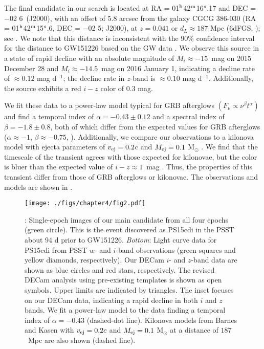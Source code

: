 \clearpage
The final candidate in our search is located at RA = 01$^{\rm h}$42$^{\rm m}$16$^{\rm s}$.17 and DEC = $-$02 6\arcsec~(J2000), with an offset of $5.8$ arcsec from the galaxy CGCG 386-030 (RA =  01$^{\rm h}$42$^{\rm m}$15$^{\rm s}$.6, DEC = $-$02 5\arcsec; J2000), at $z = 0.041$ or $d_L \approx 187$ Mpc (6dFGS, \citealt{Jones+04,Jones+09}); see . We note that this distance is inconsistent with the 90\% confidence interval for the distance to GW151226 based on the GW data \citep{LIGOGW151226}. We observe this source in a state of rapid decline with an absolute magnitude of $M_i \approx -15$~mag on 2015 December 28 and $M_i\approx -14.5$~mag on 2016 January 1, indicating a decline rate of $\approx 0.12$ mag d$^{-1}$; the decline rate in $z$-band is $\approx 0.10$ mag d$^{-1}$. Additionally, the source exhibits a red $i-z$ color of $0.3$ mag.

We fit these data to a power-law model typical for GRB afterglows $(F_\nu \propto \nu^{\beta} t^{\alpha})$ and find a temporal index of $\alpha = -0.43\pm0.12$ and a spectral index of $\beta = -1.8\pm0.8$, both of which differ from the expected values for GRB afterglows ($\alpha \approx -1$, $\beta \approx -0.75$, \citealt{Sari+98}). Additionally, we compare our observations to a kilonova model with ejecta parameters of $v_{\rm ej} = 0.2$c and $M_{\rm ej} = 0.1$ M$_\odot$ \citep{BarnesKasen13}. We find that the timescale of the transient agrees with those expected for kilonovae, but the color is bluer than the expected value of $i-z \approx 1$~mag \citep{BarnesKasen13}. Thus, the properties of this transient differ from those of GRB afterglows or kilonovae. The observations and models are shown in .

 \begin{figure}[t!]
 \centering
 \texttt{[image: ./figs/chapter4/fig2.pdf]}
 \caption{\singlespace {}: Single-epoch images of our main candidate
 from all four epochs (green circle). This is the event discovered as PS15cdi in
 the PSST about 94 d prior to GW151226. {\it Bottom}: Light
 curve data for PS15cdi from PSST $w$- and $i$-band
 observations (green squares and yellow diamonds, respectively).
 Our DECam $i$- and $z$-band data are shown as
 blue circles and red stars, respectively. The revised DECam analysis
 using pre-existing templates is shown as open symbols. Upper
 limits are indicated by triangles. The inset focuses on our
 DECam data, indicating a rapid decline in both $i$ and $z$
 bands.  We fit a power-law model to the data finding a temporal index of
 $\alpha = -0.43$ (dashed-dot line). Kilonova models from Barnes and
 Kasen \citeyearpar{BarnesKasen13} with $v_{\rm ej}=0.2c$ and $M_{\rm ej}=0.1$ M$_\odot$
 at a distance of $187$~Mpc are also shown (dashed line).}
 \label{fig:ch4_PS15cdi}
 \end{figure}


